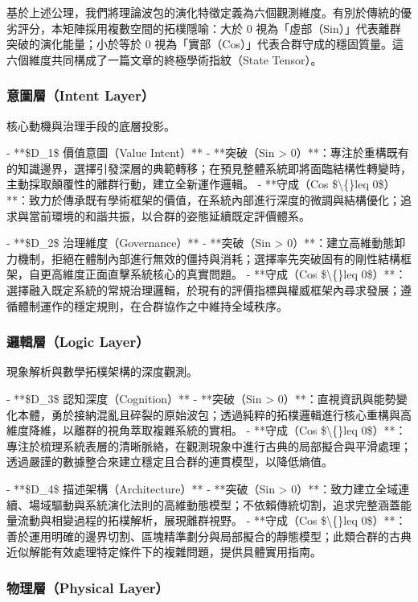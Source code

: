 \documentclass{article}
\begin{document}
基於上述公理，我們將理論波包的演化特徵定義為六個觀測維度。有別於傳統的優劣評分，本矩陣採用複數空間的拓樸隱喻：大於 0 視為「虛部（Sin）」代表離群突破的演化能量；小於等於 0 視為「實部（Cos）」代表合群守成的穩固質量。這六個維度共同構成了一篇文章的終極學術指紋（State Tensor）。

\subsubsection{意圖層（Intent Layer）}

核心動機與治理手段的底層投影。

- **\$D\_1\$ 價值意圖（Value Intent）**
  - **突破（Sin > 0）**：專注於重構既有的知識邊界，選擇引發深層的典範轉移；在預見整體系統即將面臨結構性轉變時，主動採取顛覆性的離群行動，建立全新運作邏輯。
  - **守成（Cos \$\textbackslash\{\}leq 0\$）**：致力於傳承既有學術框架的價值，在系統內部進行深度的微調與結構優化；追求與當前環境的和諧共振，以合群的姿態延續既定評價體系。

- **\$D\_2\$ 治理維度（Governance）**
  - **突破（Sin > 0）**：建立高維動態卸力機制，拒絕在體制內部進行無效的僵持與消耗；選擇率先突破固有的剛性結構框架，自更高維度正面直擊系統核心的真實問題。
  - **守成（Cos \$\textbackslash\{\}leq 0\$）**：選擇融入既定系統的常規治理邏輯，於現有的評價指標與權威框架內尋求發展；遵循體制運作的穩定規則，在合群協作之中維持全域秩序。

\subsubsection{邏輯層（Logic Layer）}

現象解析與數學拓樸架構的深度觀測。

- **\$D\_3\$ 認知深度（Cognition）**
  - **突破（Sin > 0）**：直視資訊與能勢變化本體，勇於接納混亂且碎裂的原始波包；透過純粹的拓樸邏輯進行核心重構與高維度降維，以離群的視角萃取複雜系統的實相。
  - **守成（Cos \$\textbackslash\{\}leq 0\$）**：專注於梳理系統表層的清晰脈絡，在觀測現象中進行古典的局部擬合與平滑處理；透過嚴謹的數據整合來建立穩定且合群的連貫模型，以降低熵值。

- **\$D\_4\$ 描述架構（Architecture）**
  - **突破（Sin > 0）**：致力建立全域連續、場域驅動與系統演化法則的高維動態模型；不依賴傳統切割，追求完整涵蓋能量流動與相變過程的拓樸解析，展現離群視野。
  - **守成（Cos \$\textbackslash\{\}leq 0\$）**：善於運用明確的邊界切割、區塊精準劃分與局部擬合的靜態模型；此類合群的古典近似解能有效處理特定條件下的複雜問題，提供具體實用指南。

\subsubsection{物理層（Physical Layer）}
\end{document}
